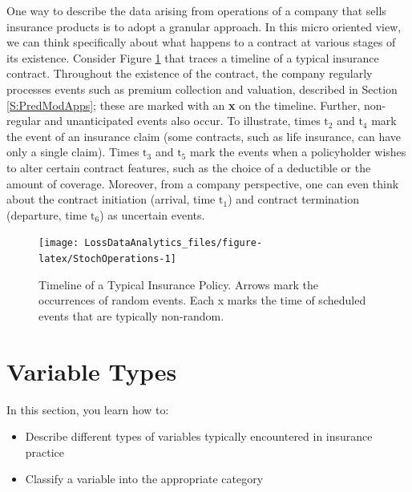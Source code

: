 \documentclass[]{book}
\providecommand{\tightlist}{%
  \setlength{\itemsep}{0pt}\setlength{\parskip}{0pt}}
\theoremstyle{definition}
\theoremstyle{definition}
\theoremstyle{definition}
\theoremstyle{remark}
\begin{document}
One way to describe the data arising from operations of a company that
sells insurance products is to adopt a granular approach. In this micro
oriented view, we can think specifically about what happens to a
contract at various stages of its existence. Consider Figure
\ref{fig:StochOperations} that traces a timeline of a typical insurance
contract. Throughout the existence of the contract, the company
regularly processes events such as premium collection and valuation,
described in Section \ref{S:PredModApps}; these are marked with an
\textbf{x} on the timeline. Further, non-regular and unanticipated
events also occur. To illustrate, times \(\mathrm{t}_2\) and
\(\mathrm{t}_4\) mark the event of an insurance claim (some contracts,
such as life insurance, can have only a single claim). Times
\(\mathrm{t}_3\) and \(\mathrm{t}_5\) mark the events when a
policyholder wishes to alter certain contract features, such as the
choice of a deductible or the amount of coverage. Moreover, from a
company perspective, one can even think about the contract initiation
(arrival, time \(\mathrm{t}_1\)) and contract termination (departure,
time \(\mathrm{t}_6\)) as uncertain events.





\begin{figure}

{\centering \texttt{[image: LossDataAnalytics\_files/figure-latex/StochOperations-1]} 

}

\caption{Timeline of a Typical Insurance Policy. Arrows
mark the occurrences of random events. Each x marks the time of
scheduled events that are typically non-random.}\label{fig:StochOperations}
\end{figure}

\section{Variable Types}\label{variable-types}

In this section, you learn how to:

\begin{itemize}
\tightlist
\item
  Describe different types of variables typically encountered in
  insurance practice
\item
  Classify a variable into the appropriate category
\end{itemize}
\end{document}
